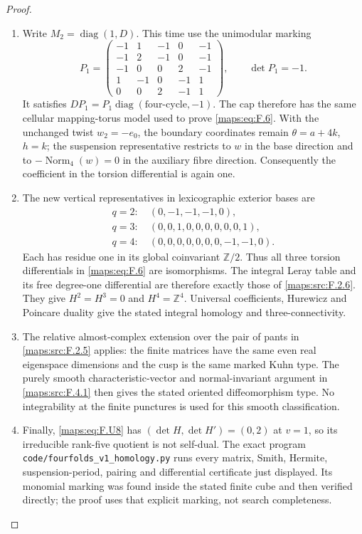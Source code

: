 \documentclass[11pt,a4paper]{article}
\theoremstyle{definition}
\begin{document}
\begin{proof}
\begin{enumerate}[label=\arabic*.]
\item Write $M_2=\operatorname{diag}(1,D)$.  This time use the
unimodular marking
\[
 P_1=\begin{pmatrix}
 -1&1&-1&0&-1\\
 -1&2&-1&0&-1\\
 -1&0&0&2&-1\\
 1&-1&0&-1&1\\
 0&0&2&-1&1
 \end{pmatrix},\qquad \det P_1=-1.
\]
It satisfies $DP_1=P_1\operatorname{diag}(\text{four-cycle},-1)$.
The cap therefore has the same cellular mapping-torus model
used to prove \eqref{maps:eq:F.6}.  With the unchanged twist $w_2=-e_0$,
the boundary coordinates remain $\theta=a+4k$, $h=k$;
the suspension representative restricts to $w$ in the base
direction and to $-\operatorname{Norm}_4(w)=0$ in the
auxiliary fibre direction.  Consequently the coefficient in
the torsion differential is again one.

\item The new vertical representatives in lexicographic exterior
bases are
\[
\begin{split}
 q=2:\ &(0,-1,-1,-1,0),\\
 q=3:\ &(0,0,1,0,0,0,0,0,0,1),\\
 q=4:\ &(0,0,0,0,0,0,0,-1,-1,0).
\end{split}
\]
Each has residue one in its global coinvariant
$\mathbb Z/2$.  Thus all three torsion differentials in \eqref{maps:eq:F.6}
are isomorphisms.  The integral Leray table and its free
degree-one differential are therefore exactly those of
\ref{maps:src:F.2.6}.  They give $H^2=H^3=0$ and $H^4=\mathbb Z^4$.
Universal coefficients, Hurewicz and Poincare duality give
the stated integral homology and three-connectivity.

\item The relative almost-complex extension over the pair of pants
in \ref{maps:src:F.2.5} applies: the finite matrices have the same even
real eigenspace dimensions and the cusp is the same marked
Kuhn type.  The purely smooth characteristic-vector and
normal-invariant argument in \ref{maps:src:F.4.1} then gives the stated
oriented diffeomorphism type.  No integrability at the finite
punctures is used for this smooth classification.

\item Finally, \eqref{maps:eq:F.U8} has $(\det H,\det H')=(0,2)$ at $v=1$,
so its irreducible rank-five quotient is not self-dual.
The exact program
\texttt{code/fourfolds\_v1\_homology.py} runs every matrix,
Smith, Hermite, suspension-period, pairing and differential
certificate just displayed.  Its monomial marking was found
inside the stated finite cube and then verified directly;
the proof uses that explicit marking, not search completeness.

\end{enumerate}
\end{proof}
\end{document}
